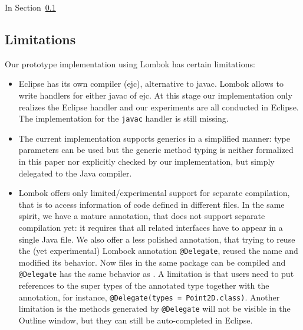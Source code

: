 In Section~\ref{} 

\subsection{Limitations}
Our prototype implementation using Lombok has certain limitations:
\begin{itemize}
\item Eclipse has its own compiler (ejc), alternative to javac.
  Lombok allows to write handlers for either javac of ejc.
  At this stage our implementation only realizes the Eclipse handler and our
  experiments are all conducted in Eclipse. The implementation for
  the \texttt{javac} handler is still missing.
\item The current implementation supports generics in a simplified manner: 
type parameters can be used but the generic
method typing is neither formalized in this paper nor explicitly checked by our 
implementation, but simply  delegated to the Java compiler.

\item 
Lombok offers only limited/experimental support for separate compilation, that is
to access information of code defined in different files.
In the same spirit, we have a mature \mixin annotation, that
does not support separate compilation yet: it requires that all
  related interfaces have to appear in a single Java file.
We also offer a less polished annotation, 
that trying to reuse the (yet experimental) Lombock annotation \lstinline{@Delegate}, reused the name and modified its behavior.
  Now files in the same package can be compiled and \lstinline{@Delegate} has the same behavior as \mixin. A limitation is
  that users need to put references to the super types of the annotated type together with the annotation, for instance,
  \lstinline{@Delegate(types = Point2D.class)}. Another limitation is the methods generated by \lstinline{@Delegate} will
  not be visible in the Outline window, but they can still be auto-completed in Eclipse.
\end{itemize}



